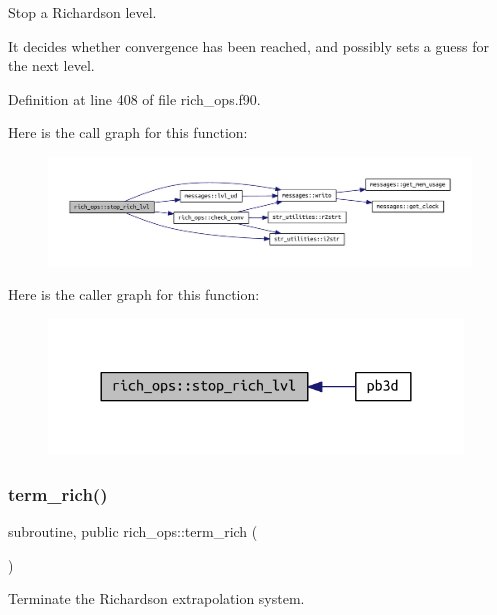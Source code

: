 Stop a Richardson level. 

It decides whether convergence has been reached, and possibly sets a guess for the next level. 

Definition at line 408 of file rich\+\_\+ops.\+f90.

Here is the call graph for this function\+:\nopagebreak
\begin{figure}[H]
\begin{center}
\leavevmode
\includegraphics[width=350pt]{namespacerich__ops_a0cce16b835e18b025d366a038b22efe1_cgraph}
\end{center}
\end{figure}
Here is the caller graph for this function\+:\nopagebreak
\begin{figure}[H]
\begin{center}
\leavevmode
\includegraphics[width=312pt]{namespacerich__ops_a0cce16b835e18b025d366a038b22efe1_icgraph}
\end{center}
\end{figure}
\mbox{\label{namespacerich__ops_a3cf72a3ed0806ac9ddff262a00b2e33d}} 
\subsubsection{\texorpdfstring{term\+\_\+rich()}{term\_rich()}}
{\footnotesize\ttfamily subroutine, public rich\+\_\+ops\+::term\+\_\+rich (\begin{DoxyParamCaption}{ }\end{DoxyParamCaption})}



Terminate the Richardson extrapolation system. 

